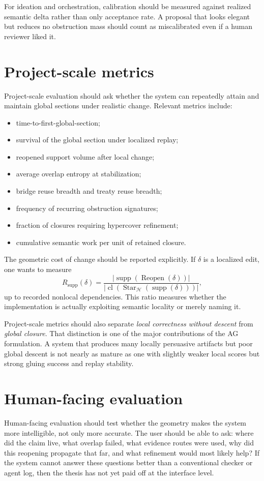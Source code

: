 \documentclass[11pt]{report}
\begin{document}
For ideation and orchestration, calibration should be measured against realized semantic delta rather than only acceptance rate. A proposal that looks elegant but reduces no obstruction mass should count as miscalibrated even if a human reviewer liked it.

\section{Project-scale metrics}
Project-scale evaluation should ask whether the system can repeatedly attain and maintain global sections under realistic change. Relevant metrics include:
\begin{itemize}
\item time-to-first-global-section;
\item survival of the global section under localized replay;
\item reopened support volume after local change;
\item average overlap entropy at stabilization;
\item bridge reuse breadth and treaty reuse breadth;
\item frequency of recurring obstruction signatures;
\item fraction of closures requiring hypercover refinement;
\item cumulative semantic work per unit of retained closure.
\end{itemize}

The geometric cost of change should be reported explicitly. If $\delta$ is a localized edit, one wants to measure
\[
R_{\mathrm{supp}}(\delta)
=
\frac{
\bigl|\operatorname{supp}(\operatorname{Reopen}(\delta))\bigr|
}{
\bigl|\operatorname{cl}(\operatorname{Star}_{\mathcal{H}}(\operatorname{supp}(\delta)))\bigr|
},
\]
up to recorded nonlocal dependencies. This ratio measures whether the implementation is actually exploiting semantic locality or merely naming it.

Project-scale metrics should also separate \emph{local correctness without descent} from \emph{global closure}. That distinction is one of the major contributions of the AG formulation. A system that produces many locally persuasive artifacts but poor global descent is not nearly as mature as one with slightly weaker local scores but strong gluing success and replay stability.

\section{Human-facing evaluation}
Human-facing evaluation should test whether the geometry makes the system more intelligible, not only more accurate. The user should be able to ask: where did the claim live, what overlap failed, what evidence routes were used, why did this reopening propagate that far, and what refinement would most likely help? If the system cannot answer these questions better than a conventional checker or agent log, then the thesis has not yet paid off at the interface level.
\end{document}
